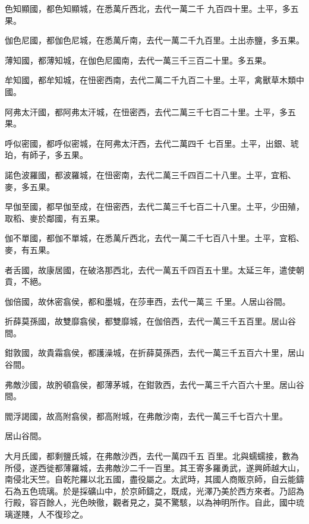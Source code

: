 \begin{pinyinscope}
 色知顯國，都色知顯城，在悉萬斤西北，去代一萬二千
 九百四十里。土平，多五果。



 伽色尼國，都伽色尼城，在悉萬斤南，去代一萬二千九百里。土出赤鹽，多五果。



 薄知國，都薄知城，在伽色尼國南，去代一萬三千三百二十里。多五果。



 牟知國，都牟知城，在忸密西南，去代二萬二千九百二十里。土平，禽獸草木類中國。



 阿弗太汗國，都阿弗太汗城，在忸密西，去代二萬三千七百二十里。土平，多五果。



 呼似密國，都呼似密城，在阿弗太汗西，去代二萬四千
 七百里。土平，出銀、琥珀，有師子，多五果。



 諾色波羅國，都波羅城，在忸密南，去代二萬三千四百二十八里。土平，宜稻、麥，多五果。



 早伽至國，都早伽至成，在忸密西，去代二萬三千七百二十八里。土平，少田殖，取稻、麥於鄰國，有五果。



 伽不單國，都伽不單城，在悉萬斤西北，去代一萬二千七百八十里。土平，宜稻、麥，有五果。



 者舌國，故康居國，在破洛那西北，去代一萬五千四百五十里。太延三年，遣使朝貢，不絕。



 伽倍國，故休密翕侯，都和墨城，在莎車西，去代一萬三
 千里。人居山谷間。



 折薛莫孫國，故雙靡翕侯，都雙靡城，在伽倍西，去代一萬三千五百里。居山谷間。



 鉗敦國，故貴霜翕侯，都護澡城，在折薛莫孫西，去代一萬三千五百六十里，居山谷間。



 弗敵沙國，故肹頓翕侯，都薄茅城，在鉗敦西，去代一萬三千六百六十里。居山谷間。



 閻浮謁國，故高附翕侯，都高附城，在弗敵沙南，去代一萬三千七百六十里。



 居山谷間。



 大月氏國，都剩鹽氏城，在弗敵沙西，去代一萬四千五
 百里。北與蠕蠕接，數為所侵，遂西徙都薄羅城，去弗敵沙二千一百里。其王寄多羅勇武，遂興師越大山，南侵北天竺。自乾陀羅以北五國，盡役屬之。太武時，其國人商販京師，自云能鑄石為五色琉璃。於是採礦山中，於京師鑄之，既成，光澤乃美於西方來者。乃詔為行殿，容百餘人，光色映徹，觀者見之，莫不驚駭，以為神明所作。自此，國中琉璃遂賤，人不復珍之。




\end{pinyinscope}

